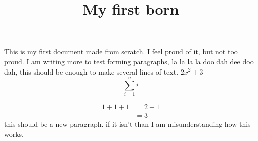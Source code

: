 \documentclass[11pt]{ximera}
\title{My first born}
\begin{document}
This is my first \LaTex document made  from scratch. I feel proud of it, but not too proud. I am writing more to test forming paragraphs, la la la la doo dah dee doo dah, this should be enough to make several lines of text. $2x^2+3$
\[
\sum_{i=1}^n i
\]

\begin{align*}
1+1+1 &= 2+1\\
&=3
\end{align*}
this should be a new paragraph. if it isn't than I am misunderstanding how this works.
\end{document}
